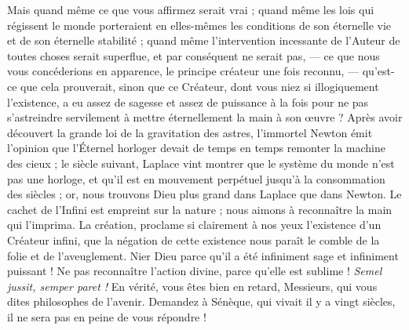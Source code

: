 \documentclass[a4paper, 11pt, oneside]{article}
\begin{document}
Mais quand même ce que vous affirmez serait vrai ; quand même les lois qui régissent le monde porteraient en elles-mêmes les conditions de son éternelle vie et de son éternelle stabilité ; quand même l'intervention incessante de l'Auteur de toutes choses serait superflue, et par conséquent ne serait pas, --- ce que nous vous concéderions en apparence, le principe créateur une fois reconnu, --- qu'est-ce que cela prouverait, sinon que ce Créateur, dont vous niez si illogiquement l'existence, a eu assez de sagesse et assez de puissance à la fois pour ne pas s'astreindre servilement à mettre éternellement la main à son œuvre ? Après avoir découvert la grande loi de la gravitation des astres, l'immortel Newton émit l'opinion que l'Éternel horloger devait de temps en temps remonter la machine des cieux ; le siècle suivant, Laplace vint montrer que le système du monde n'est pas une horloge, et qu'il est en mouvement perpétuel jusqu'à la consommation des siècles ; or, nous trouvons Dieu plus grand dans Laplace que dans Newton. Le cachet de l'Infini est empreint sur la nature ; nous aimons à reconnaître la main qui l'imprima. La création, proclame si clairement à nos yeux l'existence d'un Créateur infini, que la négation de cette existence nous paraît le comble de la folie et de l'aveuglement. Nier Dieu parce qu'il a été infiniment sage et infiniment puissant ! Ne pas reconnaître l'action divine, parce qu'elle est sublime ! \emph{Semel jussit, semper paret !} En vérité, vous êtes bien en retard, Messieurs, qui vous dites philosophes de l'avenir. Demandez à Sénèque, qui vivait il y a vingt siècles, il ne sera pas en peine de vous répondre !
\end{document}
